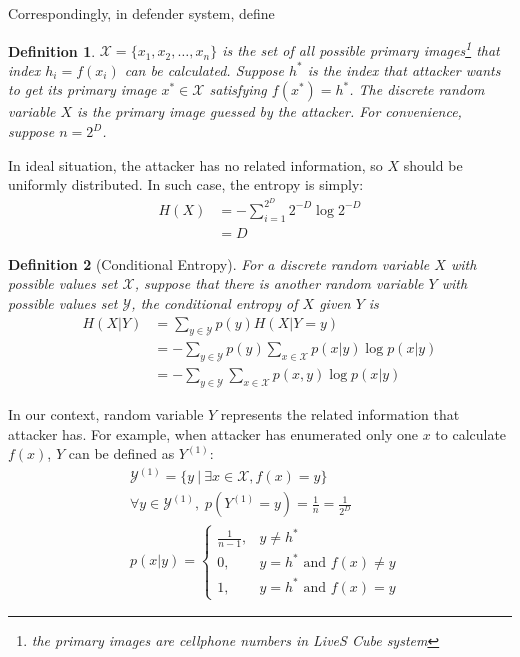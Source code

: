 \documentclass[10pt,a4paper]{article}
\newtheorem{mydef}{Definition}
\begin{document}
		Correspondingly, in defender system, define
		\begin{mydef}\label{def2}
			$\mathcal{X} = \{x_1, x_2, \ldots, x_n\}$ is the set of all possible 
			primary images\footnote{the primary images are cellphone numbers
			in LiveS Cube system} that index $h_i = f(x_i)$ can be calculated.
			Suppose $h^*$ is the index that attacker wants to
			get its primary image $x^* \in \mathcal{X}$ satisfying $f(x^*) = h^*$.
			The discrete random variable $X$ is the
			primary image guessed by the attacker. For convenience,
			suppose $n = 2^D$.
		\end{mydef}
		
		In ideal situation, the attacker has no related information, so $X$ should
		be uniformly distributed. In such case, the entropy is simply:
		\begin{align*}
			H(X) &= -\sum_{i=1}^{2^D} 2^{-D} \log 2^{-D}\\
				&= D
		\end{align*}
		
		\begin{mydef}[Conditional Entropy]\label{def_con_entropy}
			For a discrete random variable $X$ with
			possible values set $\mathcal X$,
			suppose that there is another random
			variable $Y$ with possible values
			set $\mathcal{Y}$, the conditional entropy
			of $X$ given $Y$ is
			\begin{align}
				H(X|Y) &= \sum_{y \in \mathcal Y} p(y) H(X | Y = y)\\
					&= -\sum_{y \in \mathcal Y} p(y) \sum_{x \in \mathcal X} p(x|y) \log p(x|y)\\
					&= -\sum_{y \in \mathcal Y} \sum_{x \in \mathcal X} p(x, y) \log p(x|y)
			\end{align}
		\end{mydef}
		
		In our context, random variable $Y$ represents the related information
		that attacker has. For example, when attacker has enumerated only one
		$x$ to calculate $f(x)$, $Y$ can be defined as $Y^{(1)}$:
		\begin{align*}
			&\mathcal Y^{(1)} = \{y \: | \: \exists x \in \mathcal X, f(x) = y\}\\
			&\forall y \in \mathcal Y^{(1)}, \; p(Y^{(1)} = y) = \frac{1}{n} = \frac{1}{2^D}\\
			&p(x|y) = \begin{cases}
				\frac{1}{n-1}, &y \neq h^*\\
				0, &y = h^* \text{ and } f(x) \neq y\\
				1, &y = h^* \text{ and } f(x) = y
			\end{cases}
		\end{align*}
		
\end{document}
